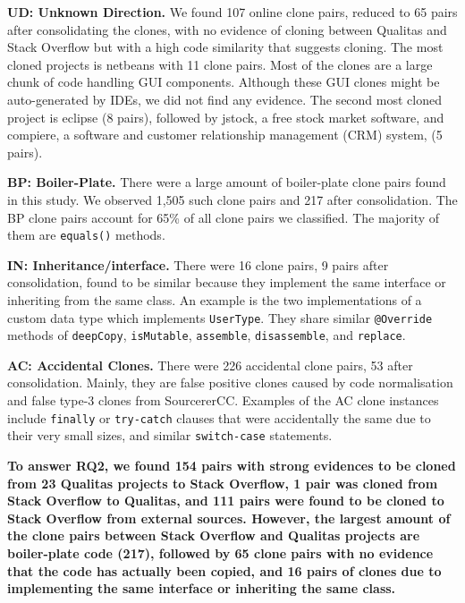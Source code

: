\documentclass[10pt,journal,compsoc]{IEEEtran}
\begin{document}
\textbf{UD: Unknown Direction.} We found 107 online clone pairs, reduced to 65
pairs after consolidating the clones, with no evidence of cloning between Qualitas
and Stack Overflow but with a high code similarity that suggests cloning. 
The most cloned projects is \textsf{netbeans} with 11 clone pairs. Most of the
clones are a large chunk of code handling GUI components. Although these GUI
clones might be auto-generated by IDEs, we did not find any evidence. The second
most cloned project is \textsf{eclipse} (8 pairs), followed by \textsf{jstock},
a free stock market software, and \textsf{compiere}, a software and customer
relationship management (CRM) system, (5 pairs).

\textbf{BP: Boiler-Plate.} There were a large amount of boiler-plate clone pairs
found in this study. We observed 1,505 such clone pairs and 217 after
consolidation. The BP clone pairs account for 65\% of all clone pairs we
classified. The majority of them are {\small{\texttt{equals()}}} methods.

\textbf{IN: Inheritance/interface.} There were 16 clone pairs, 9 pairs after
consolidation, found to be similar because they implement the same interface or
inheriting from the same class. An example is the two implementations of a
custom data type which implements {\small\texttt{UserType}}. They share similar
{\small\texttt{@Override}} methods of {\small\texttt{deepCopy}},
{\small\texttt{isMutable}}, {\small\texttt{assemble}},
{\small\texttt{disassemble}}, and {\small\texttt{replace}}.

\textbf{AC: Accidental Clones.} There were 226 accidental clone
pairs, 53 after consolidation. Mainly, they are false positive clones caused by code
normalisation and false type-3 clones from SourcererCC. 
Examples of the AC clone instances include {\small\texttt{finally}} or
{\small\texttt{try-catch}} clauses that were accidentally the same due
to their very small sizes, and similar {\small\texttt{switch-case}}
statements.

\textbf{To answer RQ2, we found 154 pairs with
	strong evidences to be cloned from 23 Qualitas projects to Stack Overflow, 1 pair
	was cloned from Stack Overflow to Qualitas, and
	111 pairs were found to be cloned to Stack Overflow from external
	sources. However, the largest amount of the clone pairs
	between Stack Overflow and Qualitas projects are \linebreak boiler-plate code
	(217), followed by 65 clone pairs with no evidence that the code has actually been copied,
	and 16 pairs of clones due to implementing the same interface or inheriting the same class.} 
\end{document}
